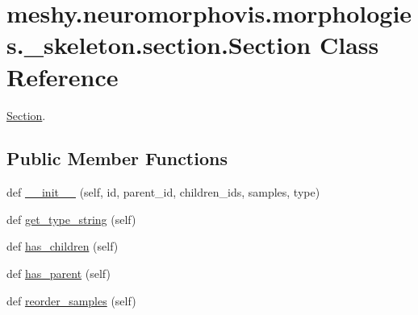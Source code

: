 \hypertarget{classmeshy_1_1neuromorphovis_1_1morphologies_1_1__skeleton_1_1section_1_1Section}{}\section{meshy.\+neuromorphovis.\+morphologies.\+\_\+skeleton.\+section.\+Section Class Reference}
\label{classmeshy_1_1neuromorphovis_1_1morphologies_1_1__skeleton_1_1section_1_1Section}


\hyperlink{classmeshy_1_1neuromorphovis_1_1morphologies_1_1__skeleton_1_1section_1_1Section}{Section}.  


\subsection*{Public Member Functions}
\begin{DoxyCompactItemize}
\item 
def \hyperlink{classmeshy_1_1neuromorphovis_1_1morphologies_1_1__skeleton_1_1section_1_1Section_a89a852d523219cd3cdb4f74098d19d6c}{\+\_\+\+\_\+init\+\_\+\+\_\+} (self, id, parent\+\_\+id, children\+\_\+ids, samples, type)
\item 
def \hyperlink{classmeshy_1_1neuromorphovis_1_1morphologies_1_1__skeleton_1_1section_1_1Section_a06caaf805287962f32bb4ba477628567}{get\+\_\+type\+\_\+string} (self)
\item 
def \hyperlink{classmeshy_1_1neuromorphovis_1_1morphologies_1_1__skeleton_1_1section_1_1Section_ab8b786c3d81679d14e97b7467f4df1a7}{has\+\_\+children} (self)
\item 
def \hyperlink{classmeshy_1_1neuromorphovis_1_1morphologies_1_1__skeleton_1_1section_1_1Section_a2eeaaba6cd091d9b41562536123bb115}{has\+\_\+parent} (self)
\item 
def \hyperlink{classmeshy_1_1neuromorphovis_1_1morphologies_1_1__skeleton_1_1section_1_1Section_aa2f85c9bfe753fc521160677ebfdecb6}{reorder\+\_\+samples} (self)
\end{DoxyCompactItemize}
